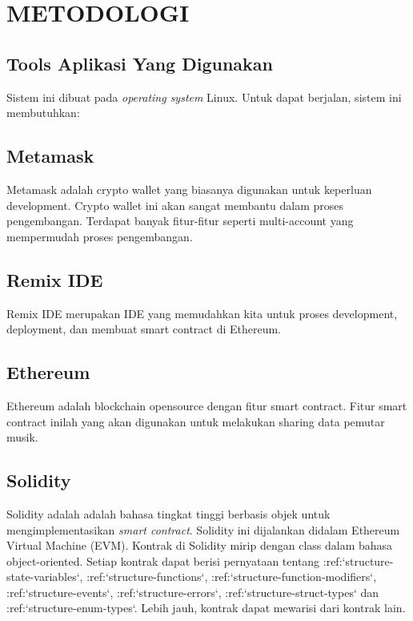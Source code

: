 \section{METODOLOGI}


\subsection{Tools Aplikasi Yang Digunakan}

Sistem ini dibuat pada \emph{operating system} Linux. Untuk dapat
berjalan, sistem ini membutuhkan:

\subsection{Metamask}
Metamask adalah crypto wallet yang biasanya digunakan untuk keperluan development. Crypto wallet ini
akan sangat membantu dalam proses pengembangan. Terdapat banyak fitur-fitur seperti multi-account yang mempermudah proses pengembangan.

\subsection{Remix IDE}
Remix IDE merupakan IDE yang memudahkan kita untuk proses development, deployment, dan membuat smart contract di Ethereum.

\subsection{Ethereum}
Ethereum adalah blockchain opensource dengan fitur smart contract. Fitur smart contract inilah yang akan digunakan untuk 
melakukan sharing data pemutar musik.

\subsection{Solidity}
Solidity adalah adalah bahasa tingkat tinggi berbasis objek untuk mengimplementasikan
\emph{smart contract}. Solidity ini dijalankan didalam Ethereum Virtual Machine (EVM).
Kontrak di Solidity mirip dengan class dalam bahasa object-oriented. Setiap kontrak dapat berisi pernyataan tentang :ref:`structure-state-variables`, :ref:`structure-functions`, :ref:`structure-function-modifiers`, :ref:`structure-events`, :ref:`structure-errors`, :ref:`structure-struct-types` dan :ref:`structure-enum-types`. Lebih jauh, kontrak dapat mewarisi dari kontrak lain.

